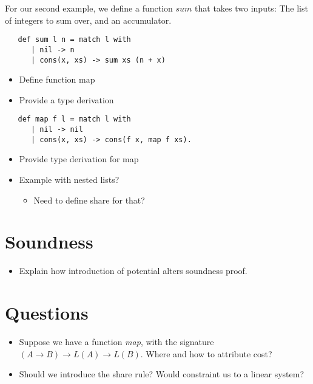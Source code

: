 For our second example, we define a function \(sum\) that takes two inputs: The list of integers to sum over, and an accumulator. 

\begin{verbatim}
   def sum l n = match l with 
      | nil -> n
      | cons(x, xs) -> sum xs (n + x)
\end{verbatim}




\begin{itemize}
   \item Define function map
   \item Provide a type derivation
\end{itemize}

\begin{verbatim}
   def map f l = match l with 
      | nil -> nil
      | cons(x, xs) -> cons(f x, map f xs).
\end{verbatim}

\begin{itemize}
   \item Provide type derivation for map
   \item Example with nested lists?
      \begin{itemize}
         \item Need to define share for that?
      \end{itemize}
\end{itemize}

\section{Soundness}
\begin{itemize}
   \item Explain how introduction of potential alters soundness proof.
\end{itemize}

\section{Questions}

\begin{itemize}
   \item Suppose we have a function \emph{map}, with the signature \((A \to B) \to L(A) \to L(B)\). Where and how to attribute cost?
   \item Should we introduce the share rule? Would constraint us to a linear system?
\end{itemize}

